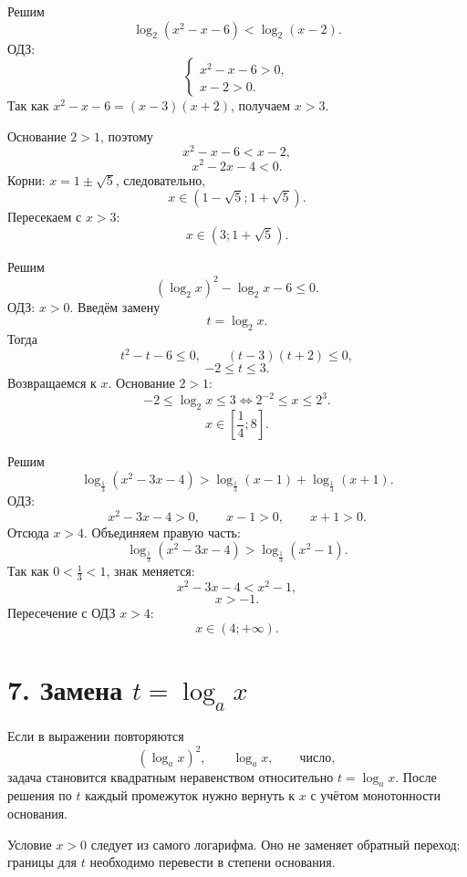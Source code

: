 \documentclass[a4paper,12pt]{article}
\begin{document}
\begin{examplebox}
Решим
\[
\log_2(x^2-x-6)<\log_2(x-2).
\]
ОДЗ:
\[
\begin{cases}
x^2-x-6>0,\\
x-2>0.
\end{cases}
\]
Так как $x^2-x-6=(x-3)(x+2)$, получаем $x>3$.

Основание $2>1$, поэтому
\[
x^2-x-6<x-2,
\]
\[
x^2-2x-4<0.
\]
Корни: $x=1\pm\sqrt5$, следовательно,
\[
x\in(1-\sqrt5;1+\sqrt5).
\]
Пересекаем с $x>3$:
\[
\boxed{x\in(3;1+\sqrt5)}.
\]
\end{examplebox}

\begin{examplebox}
Решим
\[
(\log_2 x)^2-\log_2 x-6\le0.
\]
ОДЗ: $x>0$. Введём замену
\[
t=\log_2 x.
\]
Тогда
\[
t^2-t-6\le0,
\qquad
(t-3)(t+2)\le0,
\]
\[
-2\le t\le3.
\]
Возвращаемся к $x$. Основание $2>1$:
\[
-2\le\log_2 x\le3
\Longleftrightarrow
2^{-2}\le x\le2^3.
\]
\[
\boxed{x\in\left[\frac14;8\right]}.
\]
\end{examplebox}

\begin{examplebox}
Решим
\[
\log_{\frac13}(x^2-3x-4)>
\log_{\frac13}(x-1)+\log_{\frac13}(x+1).
\]
ОДЗ:
\[
x^2-3x-4>0,\qquad x-1>0,\qquad x+1>0.
\]
Отсюда $x>4$. Объединяем правую часть:
\[
\log_{\frac13}(x^2-3x-4)>
\log_{\frac13}(x^2-1).
\]
Так как $0<\frac13<1$, знак меняется:
\[
x^2-3x-4<x^2-1,
\]
\[
x>-1.
\]
Пересечение с ОДЗ $x>4$:
\[
\boxed{x\in(4;+\infty)}.
\]
\end{examplebox}

\section*{7. Замена \(t=\log_a x\)}
\begin{keybox}
Если в выражении повторяются
\[
(\log_a x)^2,\qquad \log_a x,\qquad \text{число},
\]
задача становится квадратным неравенством относительно $t=\log_a x$.
После решения по $t$ каждый промежуток нужно вернуть к $x$ с учётом монотонности основания.
\end{keybox}

\begin{warnbox}
Условие $x>0$ следует из самого логарифма. Оно не заменяет обратный переход:
границы для $t$ необходимо перевести в степени основания.
\end{warnbox}
\end{document}
